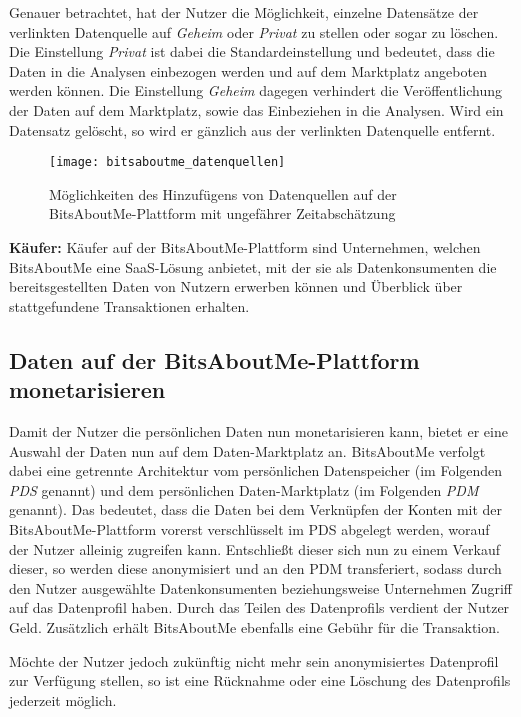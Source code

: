 \noindent Genauer betrachtet, hat der Nutzer die Möglichkeit, einzelne Datensätze der verlinkten Datenquelle auf \textit{Geheim} oder \textit{Privat} zu stellen oder sogar zu löschen. Die Einstellung \textit{Privat} ist dabei die Standardeinstellung und bedeutet, dass die Daten in die Analysen einbezogen werden und auf dem Marktplatz angeboten werden können. Die Einstellung \textit{Geheim} dagegen verhindert die Veröffentlichung der Daten auf dem Marktplatz, sowie das Einbeziehen in die Analysen. Wird ein Datensatz gelöscht, so wird er gänzlich aus der verlinkten Datenquelle entfernt.

\begin{figure}[!ht]
	\centering
	\texttt{[image: bitsaboutme\_datenquellen]}
	\caption{Möglichkeiten des Hinzufügens von Datenquellen auf der BitsAboutMe-Plattform mit ungefährer Zeitabschätzung}
	\label{fig:bitsaboutmeDatenquellen}
\end{figure}
\FloatBarrier

\noindent \textbf{Käufer:} Käufer auf der BitsAboutMe-Plattform sind Unternehmen, welchen BitsAboutMe eine SaaS-Lösung anbietet, mit der sie als Datenkonsumenten die bereitsgestellten Daten von Nutzern erwerben können und Überblick über stattgefundene Transaktionen erhalten.

\subsection{Daten auf der BitsAboutMe-Plattform monetarisieren}
Damit der Nutzer die persönlichen Daten nun monetarisieren kann, bietet er eine Auswahl der Daten nun auf dem Daten-Marktplatz an. BitsAboutMe verfolgt dabei eine getrennte Architektur vom persönlichen Datenspeicher (im Folgenden \textit{PDS} genannt) und dem persönlichen Daten-Marktplatz (im Folgenden \textit{PDM} genannt). Das bedeutet, dass die Daten bei dem Verknüpfen der Konten mit der BitsAboutMe-Plattform vorerst verschlüsselt im PDS abgelegt werden, worauf der Nutzer alleinig zugreifen kann. Entschließt dieser sich nun zu einem Verkauf dieser, so werden diese anonymisiert und an den PDM transferiert, sodass durch den Nutzer ausgewählte Datenkonsumenten beziehungsweise Unternehmen Zugriff auf das Datenprofil haben. Durch das Teilen des Datenprofils verdient der Nutzer Geld. Zusätzlich erhält BitsAboutMe ebenfalls eine Gebühr für die Transaktion.\newline

\noindent Möchte der Nutzer jedoch zukünftig nicht mehr sein anonymisiertes Datenprofil zur Verfügung stellen, so ist eine Rücknahme oder eine Löschung des Datenprofils jederzeit möglich. \newline

